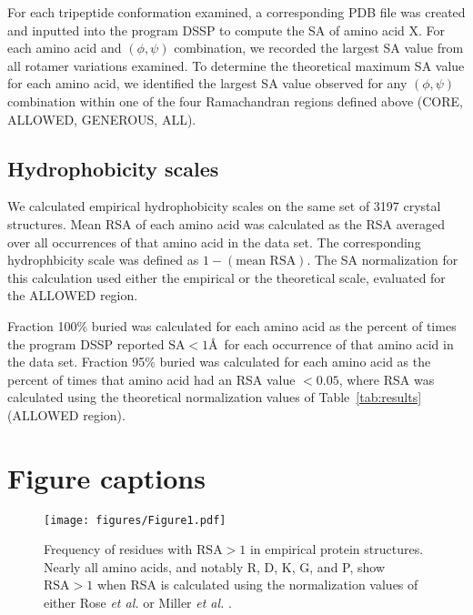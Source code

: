 \documentclass[11pt]{article}
\begin{document}
For each tripeptide conformation examined, a corresponding PDB file was created and inputted into the program DSSP \cite{Kabsch1983} to compute the SA of amino acid X. For each amino acid and $(\phi, \psi)$ combination, we recorded the largest SA value from all rotamer variations examined. To determine the theoretical maximum SA value for each amino acid, we identified the largest SA value observed for any $(\phi, \psi)$ combination within one of the four Ramachandran regions defined above (CORE, ALLOWED, GENEROUS, ALL).

\subsection*{Hydrophobicity scales}

We calculated empirical hydrophobicity scales on the same set of 3197 crystal structures. Mean RSA of each amino acid was calculated as the RSA averaged over all occurrences of that amino acid in the data set. The corresponding hydrophbicity scale was defined as $1-(\text{mean RSA})$. The SA normalization for this calculation used either the empirical or the theoretical scale, evaluated for the ALLOWED region.

Fraction 100\% buried was calculated for each amino acid as the percent of times the program DSSP reported $\text{SA}<1$\AA\ for each occurrence of that amino acid in the data set. Fraction 95\% buried was calculated for each amino acid as the percent of times that amino acid had an RSA value $<0.05$, where RSA was calculated using the theoretical normalization values of Table~\ref{tab:results} (ALLOWED region).







\newpage

\section*{Figure captions}

\begin{figure}[H]
\texttt{[image: figures/Figure1.pdf]}
\caption{\label{fig:BarGraphRSA}Frequency of residues with $\text{RSA}>1$ in empirical protein structures. Nearly all amino acids, and notably R, D, K, G, and P, show $\text{RSA}>1$ 
when RSA is calculated using the normalization values of either Rose \emph{et al.} \cite{Rose1985} or Miller \emph{et al.} \cite{Miller1987}.}
\end{figure}
\end{document}
